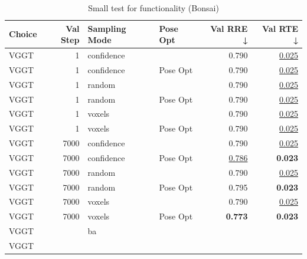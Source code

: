 \begin{table}[H]
\caption{Small test for functionality (Bonsai)}
\label{tab:99_test_bonsai}
\begin{tabular}{lrllrr}
\toprule
Choice & Val Step & Sampling Mode & Pose Opt & Val RRE ↓ & Val RTE ↓ \\
\midrule
VGGT & 1 & confidence &  & 0.790 & \underline{0.025} \\
VGGT & 1 & confidence & Pose Opt & 0.790 & \underline{0.025} \\
VGGT & 1 & random &  & 0.790 & \underline{0.025} \\
VGGT & 1 & random & Pose Opt & 0.790 & \underline{0.025} \\
VGGT & 1 & voxels &  & 0.790 & \underline{0.025} \\
VGGT & 1 & voxels & Pose Opt & 0.790 & \underline{0.025} \\
VGGT & 7000 & confidence &  & 0.790 & \underline{0.025} \\
VGGT & 7000 & confidence & Pose Opt & \underline{0.786} & \textbf{0.023} \\
VGGT & 7000 & random &  & 0.790 & \underline{0.025} \\
VGGT & 7000 & random & Pose Opt & 0.795 & \textbf{0.023} \\
VGGT & 7000 & voxels &  & 0.790 & \underline{0.025} \\
VGGT & 7000 & voxels & Pose Opt & \textbf{0.773} & \textbf{0.023} \\
VGGT &  & ba &  &  &  \\
VGGT &  &  &  &  &  \\
\bottomrule
\end{tabular}
\end{table}
